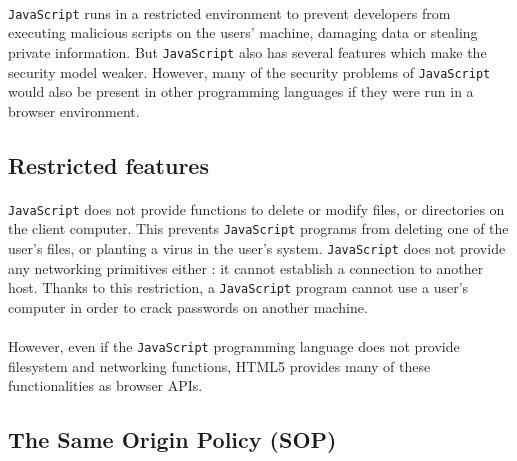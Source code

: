 \paragraph{}
\texttt{JavaScript} runs in a restricted environment to prevent developers from executing malicious scripts on the users' machine, damaging data or stealing private information. But \texttt{JavaScript} also has several features which make the security model weaker. However, many of the security problems of \texttt{JavaScript} would also be present in other programming languages if they were run in a browser environment.

\subsection{Restricted features}

\paragraph{}
\texttt{JavaScript} does not provide functions to delete or modify files, or directories on the client computer. This prevents \texttt{JavaScript} programs from deleting one of the user's files, or planting a virus in the user's system. \texttt{JavaScript} does not provide any networking primitives either : it cannot establish a connection to another host. Thanks to this restriction, a \texttt{JavaScript} program cannot use a user's computer in order to crack passwords on another machine.

\paragraph{}
However, even if the \texttt{JavaScript} programming language does not provide filesystem and networking functions, HTML5 provides many of these functionalities as browser APIs.


\subsection{The Same Origin Policy (SOP)}

